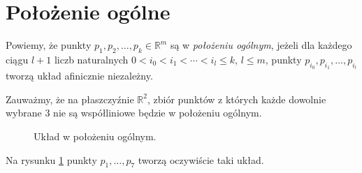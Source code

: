 \section{Położenie ogólne}
\begin{defi}
    Powiemy, że punkty $p_1, p_2, \ldots , p_k \in \mathbb{R}^m$ są w \emph{położeniu ogólnym}, jeżeli dla każdego ciągu $l+1$ liczb naturalnych $0< i_0<i_1<\cdots<i_l\le k$, $l\le m$, punkty $p_{i_0}, p_{i_1},\ldots, p_{i_l}$ tworzą układ afinicznie niezależny.
\end{defi}
\begin{przy}
    Zauważmy, że na płaszczyźnie $\mathbb{R}^2$, zbiór punktów z których każde dowolnie wybrane 3 nie są współliniowe będzie w położeniu ogólnym.
    \begin{figure}[H]
        \centering
        
        \caption{Układ w położeniu ogólnym.}
        \label{fig:polozenie_ogolne}
    \end{figure}
    Na rysunku \ref{fig:polozenie_ogolne} punkty $p_1, \ldots, p_7$ tworzą oczywiście taki układ.
\end{przy}


